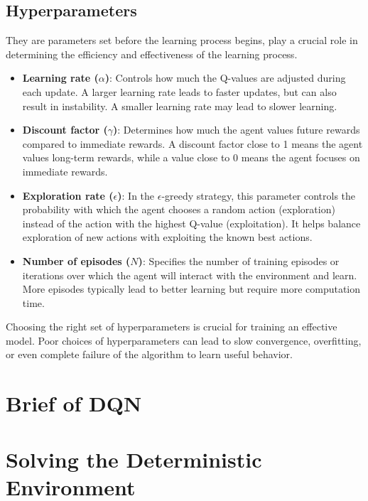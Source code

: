 \subsection{Hyperparameters}
They are parameters set before the learning process begins, play a crucial role in determining the efficiency and effectiveness of the learning process. 
\begin{itemize}
    \item \textbf{Learning rate ($\alpha$)}: Controls how much the Q-values are adjusted during each update. A larger learning rate leads to faster updates, but can also result in instability. A smaller learning rate may lead to slower learning.
    \item \textbf{Discount factor ($\gamma$)}: Determines how much the agent values future rewards compared to immediate rewards. A discount factor close to 1 means the agent values long-term rewards, while a value close to 0 means the agent focuses on immediate rewards.
    \item \textbf{Exploration rate ($\epsilon$)}: In the $\epsilon$-greedy strategy, this parameter controls the probability with which the agent chooses a random action (exploration) instead of the action with the highest Q-value (exploitation). It helps balance exploration of new actions with exploiting the known best actions.
    \item \textbf{Number of episodes ($N$)}: Specifies the number of training episodes or iterations over which the agent will interact with the environment and learn. More episodes typically lead to better learning but require more computation time.
\end{itemize}
Choosing the right set of hyperparameters is crucial for training an effective model. Poor choices of hyperparameters can lead to slow convergence, overfitting, or even complete failure of the algorithm to learn useful behavior.

\section{Brief of DQN}

\section{Solving the Deterministic Environment}
